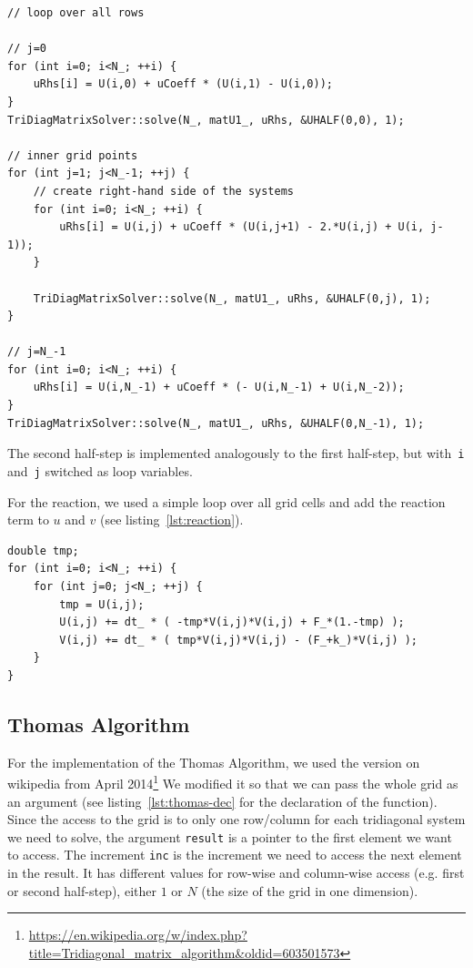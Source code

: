 \documentclass[a4paper]{article}
\begin{document}
\begin{lstlisting}[label={lst:adi-serial}, caption={Serial implementation of the first half-step (the computations for $v$ are omitted as they are analogue to the computation for $u$)}, float]
// loop over all rows

// j=0
for (int i=0; i<N_; ++i) {
    uRhs[i] = U(i,0) + uCoeff * (U(i,1) - U(i,0));
}
TriDiagMatrixSolver::solve(N_, matU1_, uRhs, &UHALF(0,0), 1);

// inner grid points
for (int j=1; j<N_-1; ++j) {
    // create right-hand side of the systems
    for (int i=0; i<N_; ++i) {
        uRhs[i] = U(i,j) + uCoeff * (U(i,j+1) - 2.*U(i,j) + U(i, j-1));
    }
    
    TriDiagMatrixSolver::solve(N_, matU1_, uRhs, &UHALF(0,j), 1);
}

// j=N_-1
for (int i=0; i<N_; ++i) {
    uRhs[i] = U(i,N_-1) + uCoeff * (- U(i,N_-1) + U(i,N_-2));
}
TriDiagMatrixSolver::solve(N_, matU1_, uRhs, &UHALF(0,N_-1), 1);
\end{lstlisting}

The second half-step is implemented analogously to the first half-step, but with~\verb+i+ and~\verb+j+ switched as loop variables.

For the reaction, we used a simple loop over all grid cells and add the reaction term to $u$ and $v$ (see listing~\ref{lst:reaction}).

\begin{lstlisting}[label={lst:reaction}, caption={Reaction, serial implementaion}, float]
double tmp;
for (int i=0; i<N_; ++i) {
    for (int j=0; j<N_; ++j) {
        tmp = U(i,j);
        U(i,j) += dt_ * ( -tmp*V(i,j)*V(i,j) + F_*(1.-tmp) );
        V(i,j) += dt_ * ( tmp*V(i,j)*V(i,j) - (F_+k_)*V(i,j) );
    }
}
\end{lstlisting}



\subsection{Thomas Algorithm}\label{sec:thomas}
For the implementation of the Thomas Algorithm, we used the version on wikipedia from April 2014\footnote{\url{https://en.wikipedia.org/w/index.php?title=Tridiagonal_matrix_algorithm&oldid=603501573}} %
We modified it so that we can pass the whole grid as an argument (see listing~\ref{lst:thomas-dec} for the declaration of the function).
Since the access to the grid is to only one row/column for each tridiagonal system we need to solve, the argument \verb+result+ is a pointer to the first element we want to access.
The increment \verb+inc+ is the increment we need to access the next element in the result.
It has different values for row-wise and column-wise access (e.g. first or second half-step), either $1$ or $N$ (the size of the grid in one dimension).
\end{document}
